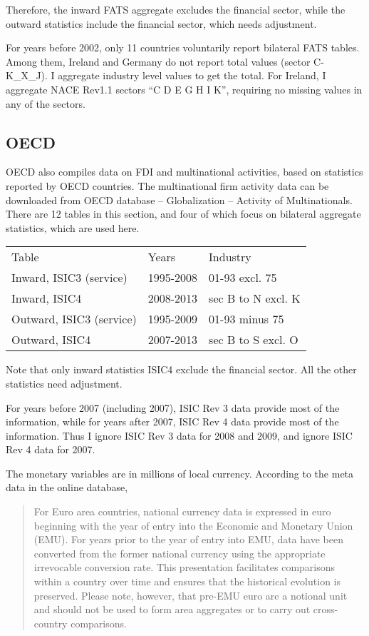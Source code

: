 \documentclass[notitlepage,11pt]{article}%
\begin{document}
Therefore, the inward FATS aggregate excludes the financial sector, while the
outward statistics include the financial sector, which needs adjustment.

For years before 2002, only 11 countries voluntarily report bilateral FATS
tables. Among them, Ireland and Germany do not report total values (sector
C-K\_X\_J). I aggregate industry level values to get the total. For Ireland, I
aggregate NACE Rev1.1 sectors \textquotedblleft C D E G H I
K\textquotedblright, requiring no missing values in any of the sectors. 

\subsection{OECD}

OECD also compiles data on FDI and multinational activities, based on
statistics reported by OECD countries. The multinational firm activity data
can be downloaded from OECD database -- Globalization -- Activity of
Multinationals. There are 12 tables in this section, and four of which focus
on bilateral aggregate statistics, which are used here.%

\begin{tabular}
[c]{lll}%
Table & Years & Industry\\
Inward, ISIC3 (service) & 1995-2008 & 01-93 excl. 75\\
Inward, ISIC4 & 2008-2013 & sec B to N excl. K\\
Outward, ISIC3 (service) & 1995-2009 & 01-93 minus 75\\
Outward, ISIC4 & 2007-2013 & sec B to S excl. O
\end{tabular}


Note that only inward statistics ISIC4 exclude the financial sector. All the
other statistics need adjustment.

For years before 2007 (including 2007), ISIC Rev 3 data provide most of the
information, while for years after 2007, ISIC Rev 4 data provide most of the
information. Thus I ignore ISIC Rev 3 data for 2008 and 2009, and ignore ISIC
Rev 4 data for 2007.

The monetary variables are in millions of local currency. According to the
meta data in the online database, 

\begin{quotation}
For Euro area countries, national currency data is expressed in euro beginning
with the year of entry into the Economic and Monetary Union (EMU). For years
prior to the year of entry into EMU, data have been converted from the former
national currency using the appropriate irrevocable conversion rate. This
presentation facilitates comparisons within a country over time and ensures
that the historical evolution is preserved. Please note, however, that pre-EMU
euro are a notional unit and should not be used to form area aggregates or to
carry out cross-country comparisons.
\end{quotation}
\end{document}
